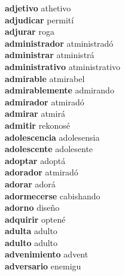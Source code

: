 \textbf{adjetivo } athetivo \\
\textbf{adjudicar } permití \\
\textbf{adjurar } roga \\
\textbf{administrador } atministradó \\
\textbf{administrar } atministrá \\
\textbf{administrativo } atministrativo \\
\textbf{admirable } atmirabel \\
\textbf{admirablemente } admirando \\
\textbf{admirador } atmiradó \\
\textbf{admirar } atmirá \\
\textbf{admitir } rekonosé \\
\textbf{adolescencia } adolesensia \\
\textbf{adolescente } adolesente \\
\textbf{adoptar } adoptá \\
\textbf{adorador } atmiradó \\
\textbf{adorar } adorá \\
\textbf{adormecerse } cabishando \\
\textbf{adorno } diseño \\
\textbf{adquirir } optené \\
\textbf{adulta } adulto \\
\textbf{adulto } adulto \\
\textbf{advenimiento } advent \\
\textbf{adversario } enemigu \\
